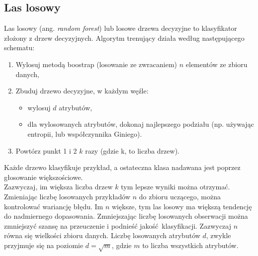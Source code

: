 \subsection{Las losowy}
Las losowy (ang. \textit{random forest}) lub losowe drzewa decyzyjne to klasyfikator złożony z drzew decyzyjnych. Algorytm trenujący działa według następującego schematu:
\begin{enumerate}
	\item Wylosuj metodą boostrap (losowanie ze zwracaniem) $n$ elementów ze zbioru danych,
	\item Zbuduj drzewo decyzyjne, w każdym węźle:
	\begin{itemize}
		\item wylosuj $d$ atrybutów,
		\item dla wylosowanych atrybutów, dokonaj najlepszego podziału (np. używając entropii, lub współczynnika Giniego).
	\end{itemize}
	\item Powtórz punkt 1 i 2 $k$ razy (gdzie k, to liczba drzew).
\end{enumerate}
Każde drzewo klasyfikuje przykład, a ostateczna klasa nadawana jest poprzez głosowanie większościowe. \\
Zazwyczaj, im większa liczba drzew $k$ tym lepsze wyniki można otrzymać. Zmieniając liczbę losowanych przykładów $n$ do zbioru uczącego, można kontrolować wariancję błędu. Im $n$ większe, tym las losowy ma większą tendencję do nadmiernego dopasowania. Zmniejszając liczbę losowanych obserwacji można zmniejszyć szansę na przeuczenie i podnieść jakość klasyfikacji. Zazwyczaj $n$ równa się wielkości zbioru danych. Liczbę losowanych atrybutów $d$, zwykle przyjmuje się na poziomie $d = \sqrt{m}$, gdzie $m$ to liczba wszystkich atrybutów.
